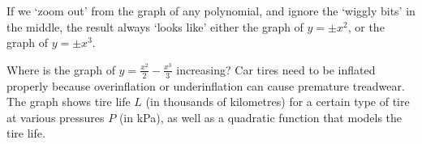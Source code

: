 \begin{questions}
  \question If we `zoom out' from the graph of any polynomial, and ignore the `wiggly bits' in the middle, the result
            always `looks like' either the graph of $ y = \pm x^2 $, or the graph of $ y = \pm x^3 $.
  \question Where is the graph of $ y = \frac{x^2}{2} - \frac{x^3}{3} $ increasing?
  \question Car tires need to be inflated properly because overinflation or
            underinflation can cause premature treadwear. The graph shows
            tire life $ L $ (in thousands of kilometres) for a certain type
            of tire at various pressures $ P $ (in kPa), as well as a quadratic
            function that models the tire life.

            \begin{center}
            \end{center}


\end{questions}
